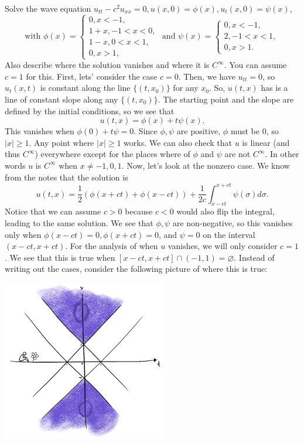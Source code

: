 \documentclass{article}
\begin{document}
\newpage
{} Solve the wave equation $u_{tt} -c^2u_{xx} = 0, u(x,0) = \phi(x), u_t(x,0) = \psi(x)$,
\[\text{with } \phi(x) = \begin{cases}
    0, x < -1, \\
    1 + x, -1 < x < 0,\\
    1 - x, 0 < x < 1,\\
    0, x >1, 
\end{cases} \text{ and } \psi(x) = \begin{cases}
    0, x < -1, \\
    2, -1 < x < 1,\\
    0, x > 1.
\end{cases}\]
Also describe where the solution vanishes and where it is $C^\infty$. You can assume $c=1$ for this. 
\tri
\hop
\solution
First, lets' consider the case $c =0$. Then, we have $u_{tt} = 0$, so $u_t(x,t)$ is constant along the line $\{(t,x_0)\}$ for any $x_0$. So, $u(t,x)$ has is a line of constant slope along any $\{(t,x_0)\}$. The starting point and the slope are defined by the initial conditions, so we see that 
\[u(t,x) = \phi(x) + t\psi(x).\]
This vanishes when $\phi(0) + t\psi =0$. Since $\phi, \psi$ are positive, $\phi$ must be $0$, so $|x| \ge 1$. Any point where $|x| \ge 1$ works. 
\hop 
We can also check that $u$ is linear (and thus $C^\infty$) everywhere except for the places where of $\phi$ and $\psi$ are not $C^\infty$. In other words $u$ is $C^\infty$ when $x \ne -1,0,1$. 
\hop
Now, let's look at the nonzero case. We know from the notes that the solution is 
\[u(t,x) = \frac{1}{2}(\phi(x+ct) + \phi(x-ct)) + \frac{1}{2c}\int_{x-ct}^{x+ct}\psi(\sigma) d\sigma.\]
Notice that we can assume $c > 0$ because $c < 0$ would also flip the integral, leading to the same solution. 
\hop 
We see that $\phi, \psi$ are non-negative, so this vanishes only when $\phi(x-ct)=0, \phi(x+ct)=0$, and $\psi = 0$ on the interval $(x-ct,x+ct)$. For the analysis of when $u$ vanishes, we will only consider $c =1$. We see that this is true when $[x-ct,x+ct] \cap (-1,1) = \varnothing$.  Instead of writing out the cases, consider the following picture of where this is true:

\begin{center}
    \includegraphics[height=7cm]{../images/0void1.jpeg}
\end{center}
\end{document}
